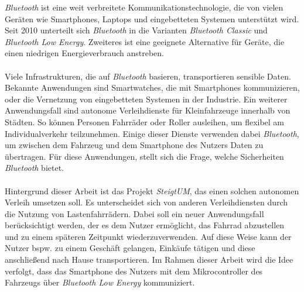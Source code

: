 \textit{Bluetooth} ist eine weit verbreitete Kommunikationstechnologie, die von vielen Geräten wie Smartphones, Laptops und eingebetteten Systemen unterstützt wird. Seit 2010 unterteilt sich \textit{Bluetooth} in die Varianten \textit{Bluetooth Classic} und \textit{Bluetooth Low Energy}. Zweiteres ist eine geeignete Alternative für Geräte, die einen niedrigen Energieverbrauch anstreben.
\\\\
Viele Infrastrukturen, die auf \textit{Bluetooth} basieren, transportieren sensible Daten. Bekannte Anwendungen sind Smartwatches, die mit Smartphones kommunizieren, oder die Vernetzung von eingebetteten Systemen in der Industrie. Ein weiterer Anwendungsfall sind autonome Verleihdienste für Kleinfahrzeuge innerhalb von Städten. So können Personen Fahrräder oder Roller ausleihen, um flexibel am Individualverkehr teilzunehmen. Einige dieser Dienste verwenden dabei \textit{Bluetooth}, um zwischen dem Fahrzeug und dem Smartphone des Nutzers Daten zu übertragen. Für diese Anwendungen, stellt sich die Frage, welche Sicherheiten \textit{Bluetooth} bietet.
\\\\
Hintergrund dieser Arbeit ist das Projekt \textit{SteigtUM}, das einen solchen autonomen Verleih umsetzen soll. Es unterscheidet sich von anderen Verleihdiensten durch die Nutzung von Lastenfahrrädern. Dabei soll ein neuer Anwendungsfall berücksichtigt werden, der es dem Nutzer ermöglicht, das Fahrrad abzustellen und zu einem späteren Zeitpunkt wiederzuverwenden. Auf diese Weise kann der Nutzer bspw. zu einem Geschäft gelangen, Einkäufe tätigen und diese anschließend nach Hause transportieren. Im Rahmen dieser Arbeit wird die Idee verfolgt, dass das Smartphone des Nutzers mit dem Mikrocontroller des Fahrzeugs über \textit{Bluetooth Low Energy} kommuniziert.